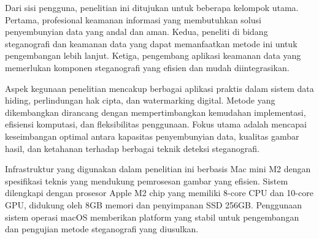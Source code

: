\documentclass{ittelkom}
\begin{document}
{    Dari sisi pengguna, penelitian ini ditujukan untuk beberapa kelompok utama.
    Pertama, profesional keamanan informasi yang membutuhkan solusi penyembunyian
    data yang andal dan aman. Kedua, peneliti di bidang steganografi dan keamanan
    data yang dapat memanfaatkan metode ini untuk pengembangan lebih lanjut.
    Ketiga, pengembang aplikasi keamanan data yang memerlukan komponen steganografi
    yang efisien dan mudah diintegrasikan.

    Aspek kegunaan penelitian mencakup berbagai aplikasi praktis dalam sistem data
    hiding, perlindungan hak cipta, dan watermarking digital. Metode yang
    dikembangkan dirancang dengan mempertimbangkan kemudahan implementasi,
    efisiensi komputasi, dan fleksibilitas penggunaan. Fokus utama adalah mencapai
    keseimbangan optimal antara kapasitas penyembunyian data, kualitas gambar
    hasil, dan ketahanan terhadap berbagai teknik deteksi steganografi.

    Infrastruktur yang digunakan dalam penelitian ini berbasis Mac mini M2 dengan
    spesifikasi teknis yang mendukung pemrosesan gambar yang efisien. Sistem
    dilengkapi dengan prosesor Apple M2 chip yang memiliki 8-core CPU dan 10-core
    GPU, didukung oleh 8GB memori dan penyimpanan SSD 256GB. Penggunaan sistem
    operasi macOS memberikan platform yang stabil untuk pengembangan dan pengujian
    metode steganografi yang diusulkan. }
\end{document}
